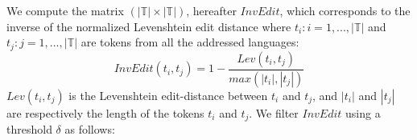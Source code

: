 \documentclass[output=paper]{langsci/langscibook}
\begin{document}


\begin{table}
\centering
{}
\caption{Example of clusters aggregated on the basis of similar tokens.}
\label{tab:common token aggregation}
\end{table}


We compute the matrix $(|\mathbb{T}| \times |\mathbb{T}|)$, hereafter
$InvEdit$, which corresponds to the inverse of the normalized
Levenshtein edit distance where $t_i : i = 1,...,|\mathbb{T}|$ and
$t_j : j = 1,...,|\mathbb{T}|$ are tokens from all the addressed
languages:
\begin{equation}\label{eq:edit}
InvEdit(t_i,t_j) = 1 - \frac{Lev(t_i,t_j)}{max(|t_i|,|t_j|)} 
\end{equation}
$Lev(t_i,t_j)$ is the Levenshtein edit-distance between $t_i$ and $t_j$, 
and $|t_i|$ and $|t_j|$ are respectively the length of the tokens $t_i$ 
and $t_j$. We filter $InvEdit$ using a threshold $\delta$ as follows:\\
\end{document}
